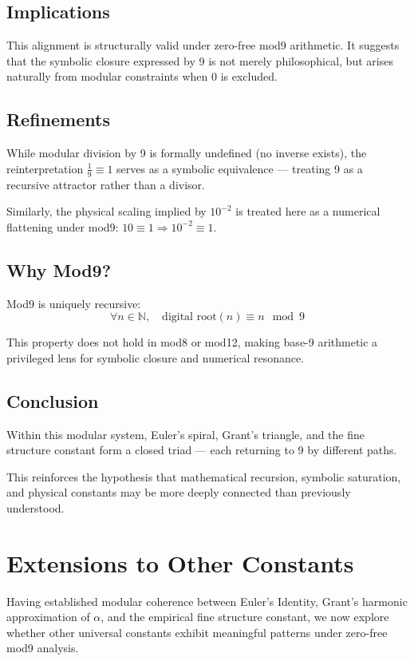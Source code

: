 \documentclass[12pt]{article}
\begin{document}
\subsection*{Implications}

This alignment is structurally valid under zero-free mod9 arithmetic. It suggests that the symbolic closure expressed by 9 is not merely philosophical, but arises naturally from modular constraints when 0 is excluded.

\subsection*{Refinements}

While modular division by 9 is formally undefined (no inverse exists), the reinterpretation \( \frac{1}{9} \equiv 1 \) serves as a symbolic equivalence — treating 9 as a recursive attractor rather than a divisor.

Similarly, the physical scaling implied by \( 10^{-2} \) is treated here as a numerical flattening under mod9: \( 10 \equiv 1 \Rightarrow 10^{-2} \equiv 1 \).

\subsection*{Why Mod9?}

Mod9 is uniquely recursive:
\[
\forall n \in \mathbb{N},\quad \text{digital root}(n) \equiv n \mod 9
\]

This property does not hold in mod8 or mod12, making base-9 arithmetic a privileged lens for symbolic closure and numerical resonance.

\subsection*{Conclusion}

Within this modular system, Euler’s spiral, Grant’s triangle, and the fine structure constant form a closed triad — each returning to 9 by different paths.

This reinforces the hypothesis that mathematical recursion, symbolic saturation, and physical constants may be more deeply connected than previously understood.

\section{Extensions to Other Constants}

Having established modular coherence between Euler’s Identity, Grant’s harmonic approximation of \(\alpha\), and the empirical fine structure constant, we now explore whether other universal constants exhibit meaningful patterns under zero-free mod9 analysis.
\end{document}
